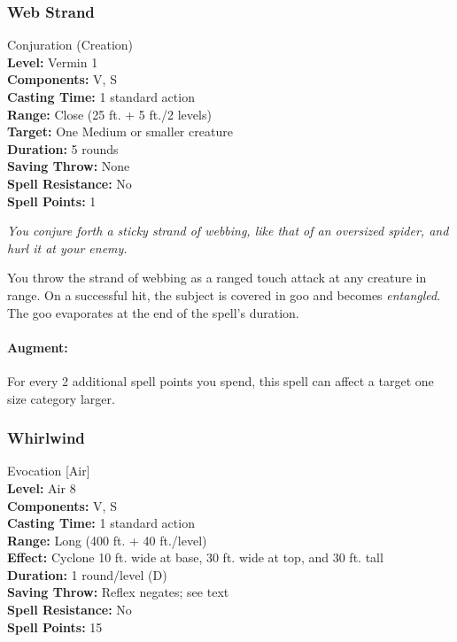 \subsubsection{Web Strand}
\label{Spell:WebStrand}
Conjuration (Creation)
\\ \textbf{Level:} Vermin 1
\\ \textbf{Components:} V, S
\\ \textbf{Casting Time:} 1 standard action
\\ \textbf{Range:} Close (25 ft. + 5 ft./2 levels)
\\ \textbf{Target:} One Medium or smaller creature
\\ \textbf{Duration:} 5 rounds
\\ \textbf{Saving Throw:} None
\\ \textbf{Spell Resistance:} No
\\ \textbf{Spell Points:} 1

\emph{You conjure forth a sticky strand of webbing, like that of an oversized spider, and hurl it at your enemy.}

You throw the strand of webbing as a ranged touch attack at any creature in range. 
On a successful hit, the subject is covered in goo and becomes \emph{entangled}. 
The goo evaporates at the end of the spell's duration.

\paragraph{Augment:} For every 2 additional spell points you spend, this spell can affect a target one size category larger.

\subsubsection{Whirlwind}
\label{Spell:Whirlwind}
Evocation [Air]
\\ \textbf{Level:} Air 8
\\ \textbf{Components:} V, S
\\ \textbf{Casting Time:} 1 standard action
\\ \textbf{Range:} Long (400 ft. + 40 ft./level)
\\ \textbf{Effect:} Cyclone 10 ft. wide at base, 30 ft. wide at top, and 30 ft. tall
\\ \textbf{Duration:} 1 round/level (D)
\\ \textbf{Saving Throw:} Reflex negates; see text
\\ \textbf{Spell Resistance:} No
\\ \textbf{Spell Points:} 15

